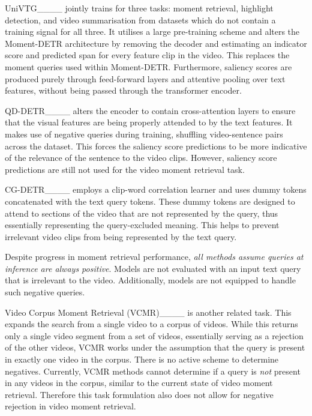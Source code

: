 UniVTG____ jointly trains for three tasks: moment retrieval, highlight detection, and video summarisation from datasets which do not contain a training signal for all three. It utilises a large pre-training scheme and alters the Moment-DETR architecture by removing the decoder and estimating an indicator score and predicted span for every feature clip in the video. This replaces the moment queries used within Moment-DETR.  
Furthermore, saliency scores are produced purely through feed-forward layers and attentive pooling over text features, without being passed through the transformer encoder.

QD-DETR____ alters the encoder to contain cross-attention layers to ensure that the visual features are being properly attended to by the text features. It makes use of negative queries during training, shuffling video-sentence pairs across the dataset. This forces the saliency score predictions to be more indicative of the relevance of the sentence to the video clips.
However, saliency score predictions are still not used for the video moment retrieval task.

CG-DETR____ employs a clip-word correlation learner and uses dummy tokens concatenated with the text query tokens. These dummy tokens are designed to attend to sections of the video that are not represented by the query, thus essentially representing the query-excluded meaning. This helps to prevent irrelevant video clips from being represented by the text query.

Despite progress in moment retrieval performance, \emph{all methods assume queries at inference are always positive}. 
Models are not evaluated with an input text query that is irrelevant to the video. 
Additionally, models are not equipped to handle such negative queries.

Video Corpus Moment Retrieval (VCMR)____ is another related task. This expands the search from a single video to a corpus of videos. While this returns only a single video segment from a set of videos, essentially serving as a rejection of the other videos, VCMR works under the assumption that the query is present in exactly one video in the corpus. There is no active scheme to determine negatives. Currently, VCMR methods cannot determine if a query is \emph{not} present in any videos in the corpus, similar to the current state of video moment retrieval. Therefore this task formulation also does not allow for negative rejection in video moment retrieval.

